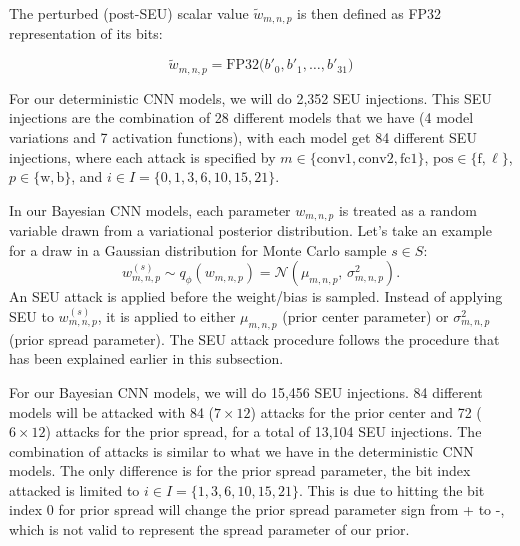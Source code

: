 The perturbed (post-SEU) scalar value $\tilde{w}_{m,n,p}$ is then defined as FP32 representation of its bits:

\begin{equation}
\tilde{w}_{m,n,p}
= \mathrm{FP32}\big(b'_{0}, b'_{1}, \ldots, b'_{31}\big)
\label{eq:perturbed_weight}
\end{equation}

For our deterministic CNN models, we will do 2,352 SEU injections. This SEU injections are the combination of 28 different models that we have (4 model variations and 7 activation functions), with each model get 84 different SEU injections, where each attack is specified by \( m \in \{\mathrm{conv1}, \mathrm{conv2}, \mathrm{fc1}\} \), \( \mathrm{pos} \in \{\mathrm{f}, \ell\} \), \( p \in \{\mathrm{w}, \mathrm{b}\} \), and \(i \in I = \{0, 1, 3, 6, 10, 15, 21\} \).


In our Bayesian CNN models, each parameter \( w_{m,n,p} \) is treated as a random variable
drawn from a variational posterior distribution. Let's take an example for a draw in a Gaussian distribution for Monte Carlo sample \(s \in S\):
\[
w_{m,n,p}^{(s)} \sim q_{\phi}(w_{m,n,p})
= \mathcal{N}\!\left(\mu_{m,n,p},\, \sigma_{m,n,p}^{2}\right).
\]
An SEU attack is applied before the weight/bias is sampled. Instead of applying SEU to \( w_{m,n,p}^{(s)} \), it is applied to either \( \mu_{m,n,p} \) (prior center parameter) or \( \sigma_{m,n,p}^{2} \) (prior spread parameter). The SEU attack procedure follows the procedure that has been explained earlier in this subsection.

For our Bayesian CNN models, we will do 15,456 SEU injections. 84 different models will be attacked with 84 ($7 \times 12$) attacks for the prior center and 72 ($6 \times 12$) attacks for the prior spread, for a total of 13,104 SEU injections. The combination of attacks is similar to what we have in the deterministic CNN models. The only difference is for the prior spread parameter, the bit index attacked is limited to \(i \in I = \{1, 3, 6, 10, 15, 21\} \). This is due to hitting the bit index 0 for prior spread will change the prior spread parameter sign from + to -, which is not valid to represent the spread parameter of our prior.

